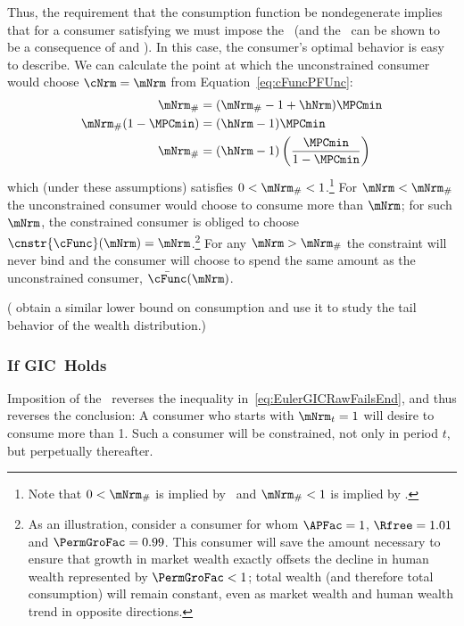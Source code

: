 \documentclass[\econtexRoot/BufferStockTheory]{subfiles}
\begin{document}
Thus, the requirement that the consumption function be nondegenerate
implies that for a consumer satisfying \cncl{\GICRaw} we must impose
the \RIC~(and the \FHWC~can be shown to be a consequence of \cncl{\GICRaw} and \RIC).
In
this case, the consumer's optimal behavior is easy to describe.
We
can calculate the point at which the unconstrained consumer would
choose $\cNrm = \mNrm$ from Equation~\eqref{eq:cFuncPFUnc}:
\begin{equation}\begin{gathered}\begin{aligned}
  \mNrm_{\#}  & = (\mNrm_{\#}-1+\hNrm)\MPCmin
  \\ \mNrm_{\#}(1-\MPCmin)  & = (\hNrm - 1)\MPCmin
  \\ \mNrm_{\#}  & = (\hNrm - 1)\left(\frac{\MPCmin}{1-\MPCmin}\right)
\end{aligned}\end{gathered}\end{equation}
which (under these assumptions) satisfies $0 < \mNrm_{\#} < 1$.\footnote{Note that $0 < \mNrm_{\#}$ is implied by \RIC~and $ \mNrm_{\#}<1$ is implied by \cncl{\GICRaw}.}  For
$\mNrm < \mNrm_{\#}$ the unconstrained consumer would choose to
consume more than $\mNrm$; for such $\mNrm$, the constrained consumer
is obliged to choose $\cnstr{\cFunc}(\mNrm) = \mNrm$.\footnote{As an
  illustration, consider a consumer for whom $\APFac = 1$, $\Rfree
  =1.01$ and $\PermGroFac = 0.99$.
This consumer will save the amount
  necessary to ensure that growth in market wealth exactly offsets the
  decline in human wealth represented by $\PermGroFac < 1$; total wealth
  (and therefore total consumption) will remain constant, even as
  market wealth and human wealth trend in opposite directions.}  For
any $\mNrm > \mNrm_{\#}$ the constraint will never bind and the
consumer will choose to spend the same amount as the unconstrained
consumer, $\bar{\cFunc}(\mNrm)$.

(\cite{StachurskiToda2019JET} obtain a similar lower bound on consumption and use it to study the tail behavior of the wealth distribution.)


\subsubsection{If {GIC}~Holds}

Imposition of the \GICRaw~reverses the inequality in~\eqref{eq:EulerGICRawFailsEnd}, and thus reverses the conclusion: A consumer who starts with $\mNrm_{t}=1$ will desire to consume more than 1.
Such a consumer will be constrained, not only in period $t$, but perpetually thereafter.
\end{document}
